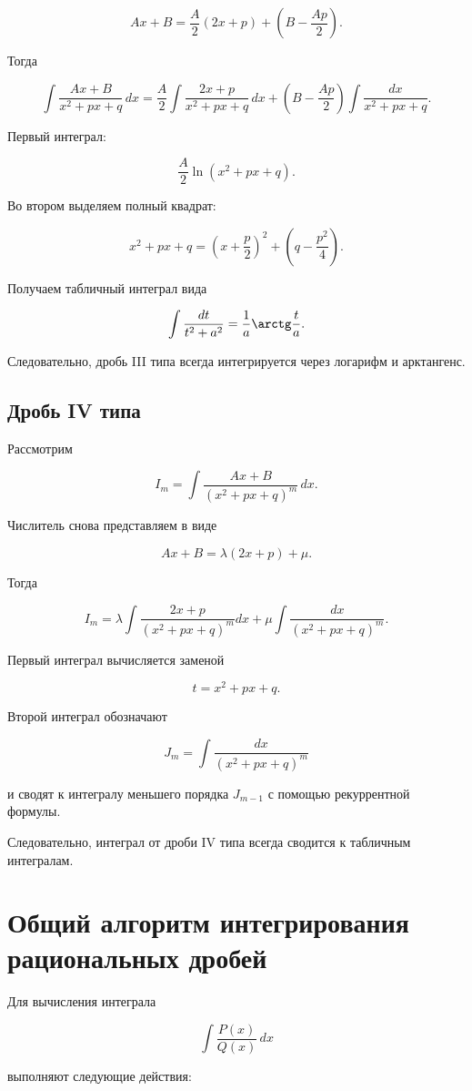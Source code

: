 \documentclass[14pt]{extreport}
\begin{document}
\[
Ax+B=
\frac A2(2x+p)
+
\left(B-\frac{Ap}{2}\right).
\]

Тогда

\[
\int\frac{Ax+B}{x^2+px+q}\,dx
=
\frac A2
\int
\frac{2x+p}{x^2+px+q}\,dx
+
\left(B-\frac{Ap}{2}\right)
\int
\frac{dx}{x^2+px+q}.
\]

Первый интеграл:

\[
\frac A2\ln(x^2+px+q).
\]

Во втором выделяем полный квадрат:

\[
x^2+px+q
=
\left(x+\frac p2\right)^2
+
\left(q-\frac{p^2}{4}\right).
\]

Получаем табличный интеграл вида

\[
\int \frac{dt}{t^2+a^2}
=
\frac1a\arctg\frac ta.
\]

Следовательно, дробь III типа всегда интегрируется через
логарифм и арктангенс.

\subsection{Дробь IV типа}

Рассмотрим

\[
I_m=
\int
\frac{Ax+B}
{(x^2+px+q)^m}
\,dx.
\]

Числитель снова представляем в виде

\[
Ax+B=
\lambda(2x+p)+\mu.
\]

Тогда

\[
I_m
=
\lambda
\int
\frac{2x+p}
{(x^2+px+q)^m}
dx
+
\mu
\int
\frac{dx}
{(x^2+px+q)^m}.
\]

Первый интеграл вычисляется заменой

\[
t=x^2+px+q.
\]

Второй интеграл обозначают

\[
J_m=
\int
\frac{dx}
{(x^2+px+q)^m}
\]

и сводят к интегралу меньшего порядка
$J_{m-1}$ с помощью рекуррентной формулы.

Следовательно, интеграл от дроби IV типа
всегда сводится к табличным интегралам.

\section{Общий алгоритм интегрирования рациональных дробей}

Для вычисления интеграла

\[
\int \frac{P(x)}{Q(x)}\,dx
\]

выполняют следующие действия:
\end{document}
